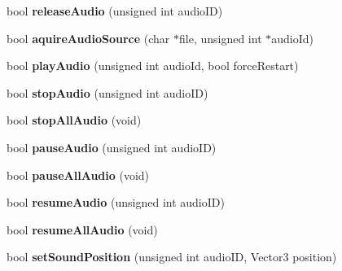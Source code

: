 \begin{DoxyCompactItemize}
\item 
\hypertarget{class_sound_manager_ae8638223cb0e8565b4f485ad56bccd03}{bool {\bfseries release\-Audio} (unsigned int audio\-I\-D)}\label{class_sound_manager_ae8638223cb0e8565b4f485ad56bccd03}

\item 
\hypertarget{class_sound_manager_a8a128ed586a43f323e41d7adaf030f33}{bool {\bfseries aquire\-Audio\-Source} (char $\ast$file, unsigned int $\ast$audio\-Id)}\label{class_sound_manager_a8a128ed586a43f323e41d7adaf030f33}

\item 
\hypertarget{class_sound_manager_a1e50bd120f94144365392bf5a163dab6}{bool {\bfseries play\-Audio} (unsigned int audio\-Id, bool force\-Restart)}\label{class_sound_manager_a1e50bd120f94144365392bf5a163dab6}

\item 
\hypertarget{class_sound_manager_a687c3db1d9d1130f9590d70d9a9f5fb5}{bool {\bfseries stop\-Audio} (unsigned int audio\-I\-D)}\label{class_sound_manager_a687c3db1d9d1130f9590d70d9a9f5fb5}

\item 
\hypertarget{class_sound_manager_ac343b4492343f4c75be9d8539a790394}{bool {\bfseries stop\-All\-Audio} (void)}\label{class_sound_manager_ac343b4492343f4c75be9d8539a790394}

\item 
\hypertarget{class_sound_manager_a01f631fd582786354869b7ffcc58f720}{bool {\bfseries pause\-Audio} (unsigned int audio\-I\-D)}\label{class_sound_manager_a01f631fd582786354869b7ffcc58f720}

\item 
\hypertarget{class_sound_manager_a2e52fa130bf73597bfe3341551812bdc}{bool {\bfseries pause\-All\-Audio} (void)}\label{class_sound_manager_a2e52fa130bf73597bfe3341551812bdc}

\item 
\hypertarget{class_sound_manager_a9f52b92c77c708a09a90d3565d9411c3}{bool {\bfseries resume\-Audio} (unsigned int audio\-I\-D)}\label{class_sound_manager_a9f52b92c77c708a09a90d3565d9411c3}

\item 
\hypertarget{class_sound_manager_a44565f0638e3a28e366aaa65ae3f1d56}{bool {\bfseries resume\-All\-Audio} (void)}\label{class_sound_manager_a44565f0638e3a28e366aaa65ae3f1d56}

\item 
\hypertarget{class_sound_manager_a4c7511ce64e05c840f94be41ccc32601}{bool {\bfseries set\-Sound\-Position} (unsigned int audio\-I\-D, Vector3 position)}\label{class_sound_manager_a4c7511ce64e05c840f94be41ccc32601}


\end{DoxyCompactItemize}
